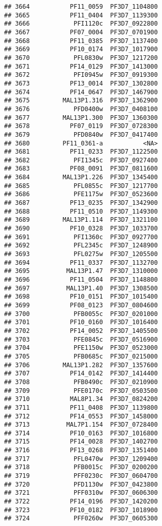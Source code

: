 \documentclass{article}\usepackage[]{graphicx}\usepackage[]{color}
\makeatletter
\newenvironment{kframe}{%
 \def\at@end@of@kframe{}%
 \ifinner\ifhmode%
  \def\at@end@of@kframe{\end{minipage}}%
  \begin{minipage}{\columnwidth}%
 \fi\fi%
 \def\FrameCommand##1{\hskip\@totalleftmargin \hskip-\fboxsep
 \colorbox{shadecolor}{##1}\hskip-\fboxsep
     \hskip-\linewidth \hskip-\@totalleftmargin \hskip\columnwidth}%
 \MakeFramed {\advance\hsize-\width
   \@totalleftmargin\z@ \linewidth\hsize
   \@setminipage}}%
 {\par\unskip\endMakeFramed%
 \at@end@of@kframe}
\newenvironment{knitrout}{}{} %
\makeatother
\begin{document}
\begin{knitrout}
\begin{kframe}
\begin{verbatim}
## 3664           PF11_0059  PF3D7_1104800
## 3665           PF11_0404  PF3D7_1139300
## 3666            PFI1120c  PF3D7_0922800
## 3667           PF07_0004  PF3D7_0701900
## 3668           PF11_0385  PF3D7_1137400
## 3669           PF10_0174  PF3D7_1017900
## 3670            PFL0830w  PF3D7_1217200
## 3671           PF14_0129  PF3D7_1413000
## 3672            PFI0945w  PF3D7_0919300
## 3673           PF13_0014  PF3D7_1302800
## 3674           PF14_0647  PF3D7_1467900
## 3675         MAL13P1.316  PF3D7_1362900
## 3676            PFD0400w  PF3D7_0408100
## 3677         MAL13P1.300  PF3D7_1360300
## 3678           PF07_0119  PF3D7_0728300
## 3679            PFD0840w  PF3D7_0417400
## 3680         PF11_0361-a           <NA>
## 3681           PF11_0233  PF3D7_1122500
## 3682            PFI1345c  PF3D7_0927400
## 3683           PF08_0091  PF3D7_0811600
## 3684         MAL13P1.226  PF3D7_1345400
## 3685            PFL0855c  PF3D7_1217700
## 3686            PFE1175w  PF3D7_0523600
## 3687           PF13_0235  PF3D7_1342900
## 3688           PF11_0510  PF3D7_1149300
## 3689         MAL13P1.114  PF3D7_1321100
## 3690           PF10_0328  PF3D7_1033700
## 3691            PFI1360c  PF3D7_0927700
## 3692            PFL2345c  PF3D7_1248900
## 3693            PFL0275w  PF3D7_1205500
## 3694           PF11_0337  PF3D7_1132700
## 3695          MAL13P1.47  PF3D7_1310000
## 3696           PF11_0504  PF3D7_1148800
## 3697          MAL13P1.40  PF3D7_1308500
## 3698           PF10_0151  PF3D7_1015400
## 3699           PF08_0123  PF3D7_0804600
## 3700            PFB0055c  PF3D7_0201000
## 3701           PF10_0160  PF3D7_1016400
## 3702           PF14_0052  PF3D7_1405500
## 3703            PFE0845c  PF3D7_0516900
## 3704            PFE1150w  PF3D7_0523000
## 3705            PFB0685c  PF3D7_0215000
## 3706         MAL13P1.282  PF3D7_1357600
## 3707           PF14_0142  PF3D7_1414400
## 3708            PFB0490c  PF3D7_0210900
## 3709            PFE0170c  PF3D7_0503500
## 3710           MAL8P1.34  PF3D7_0824200
## 3711           PF11_0408  PF3D7_1139800
## 3712           PF14_0553  PF3D7_1458000
## 3713          MAL7P1.154  PF3D7_0728400
## 3714           PF10_0163  PF3D7_1016800
## 3715           PF14_0028  PF3D7_1402700
## 3716           PF13_0268  PF3D7_1351400
## 3717            PFL0470w  PF3D7_1209400
## 3718            PFB0015c  PF3D7_0200200
## 3719            PFF0230c  PF3D7_0604700
## 3720            PFD1130w  PF3D7_0423800
## 3721            PFF0310w  PF3D7_0606300
## 3722           PF14_0196  PF3D7_1420200
## 3723           PF10_0182  PF3D7_1018900
## 3724            PFF0260w  PF3D7_0605300

\end{verbatim}
\end{kframe}
\end{knitrout}
\end{document}
